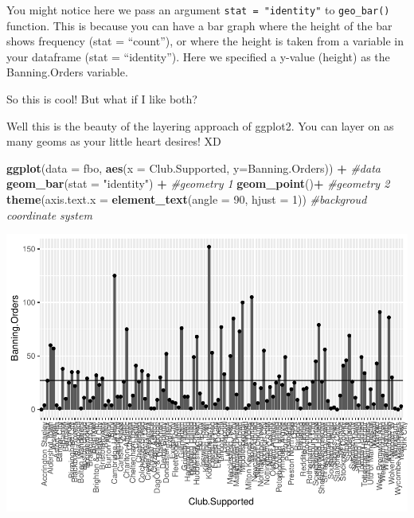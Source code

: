 \documentclass[]{book}
\newenvironment{Shaded}{\begin{snugshade}}{\end{snugshade}}
\newcommand{\CommentTok}[1]{\textcolor[rgb]{0.56,0.35,0.01}{\textit{#1}}}
\newcommand{\DataTypeTok}[1]{\textcolor[rgb]{0.13,0.29,0.53}{#1}}
\newcommand{\DecValTok}[1]{\textcolor[rgb]{0.00,0.00,0.81}{#1}}
\newcommand{\KeywordTok}[1]{\textcolor[rgb]{0.13,0.29,0.53}{\textbf{#1}}}
\newcommand{\NormalTok}[1]{#1}
\newcommand{\OperatorTok}[1]{\textcolor[rgb]{0.81,0.36,0.00}{\textbf{#1}}}
\newcommand{\StringTok}[1]{\textcolor[rgb]{0.31,0.60,0.02}{#1}}
\theoremstyle{definition}
\theoremstyle{definition}
\theoremstyle{definition}
\theoremstyle{remark}
\begin{document}
You might notice here we pass an argument \texttt{stat\ =\ "identity"}
to \texttt{geo\_bar()} function. This is because you can have a bar
graph where the height of the bar shows frequency (stat = ``count''), or
where the height is taken from a variable in your dataframe (stat =
``identity''). Here we specified a y-value (height) as the
Banning.Orders variable.

So this is cool! But what if I like both?

Well this is the beauty of the layering approach of ggplot2. You can
layer on as many geoms as your little heart desires! XD

\begin{Shaded}
\begin{Highlighting}[]
\KeywordTok{ggplot}\NormalTok{(}\DataTypeTok{data =}\NormalTok{ fbo, }\KeywordTok{aes}\NormalTok{(}\DataTypeTok{x =}\NormalTok{ Club.Supported, }\DataTypeTok{y=}\NormalTok{Banning.Orders)) }\OperatorTok{+}\StringTok{  }\CommentTok{#data}
\StringTok{  }\KeywordTok{geom_bar}\NormalTok{(}\DataTypeTok{stat =} \StringTok{"identity"}\NormalTok{) }\OperatorTok{+}\StringTok{                                  }\CommentTok{#geometry 1 }
\StringTok{  }\KeywordTok{geom_point}\NormalTok{()}\OperatorTok{+}\StringTok{                                                  }\CommentTok{#geometry 2}
\KeywordTok{theme}\NormalTok{(}\DataTypeTok{axis.text.x =} \KeywordTok{element_text}\NormalTok{(}\DataTypeTok{angle =} \DecValTok{90}\NormalTok{, }\DataTypeTok{hjust =} \DecValTok{1}\NormalTok{))                                                      }\CommentTok{#backgroud coordinate system}
\end{Highlighting}
\end{Shaded}

\includegraphics{03-visualisation_files/figure-latex/unnamed-chunk-8-1.pdf}
\end{document}
